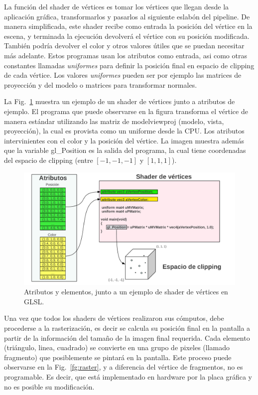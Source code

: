 La funci\'on del shader de vértices es tomar los v\'ertices que llegan desde la aplicaci\'on gr\'afica, transformarlos y pasarlos al siguiente eslab\'on del pipeline.
De manera simplificada, este shader recibe como entrada la posici\'on del v\'ertice en la escena, y terminada la ejecuci\'on devolver\'a el v\'ertice con su posici\'on modificada.
Tambi\'en podr\'ia devolver el color y otros valores \'utiles que se puedan necesitar m\'as adelante.
Estos programas usan los atributos como entrada, asi como otras constantes llamadas \emph{uniformes} para definir la posición final en espacio de clipping de cada vértice.
Los valores \emph{uniformes} pueden ser por ejemplo las matrices de proyección y del modelo o matrices para transformar normales. 

La Fig.~\ref{fg:vertexshader} muestra un ejemplo de un shader de vértices junto a atributos de ejemplo.
El programa que puede observarse en la figura transforma el vértice de manera estándar utilizando las matriz de modelviewproj (modelo, vista, proyección), la cual es provista como un uniforme desde la CPU.
Los atributos intervinientes con el color y la posición del vértice.
La imagen muestra además que la variable gl\_Position es la salida del programa, la cual tiene coordenadas del espacio de clipping (entre $[-1,-1,-1]$ y $[1,1,1]$).

\begin{figure}[h]
\begin{center}
\includegraphics[width=13cm]{figures/vertexshader}
\end{center}
\caption{Atributos y elementos, junto a un ejemplo de shader de vértices en GLSL.}
\label{fg:vertexshader}
\end{figure}

Una vez que todos los shaders de vértices realizaron sus cómputos, debe procederse a la rasterización, es decir se calcula su posición final en la pantalla a partir de la información del tamaño de la imagen final requerida.
Cada elemento (triángulo, linea, cuadrado) se convierte en una grupo de pixeles (llamado fragmento) que posiblemente se pintará en la pantalla.
Este proceso puede observarse en la Fig.~\ref{fg:raster}, y a diferencia del vértice de fragmentos, no es programable.
Es decir, que está implementado en hardware por la placa gráfica y no es posible su modificación.


